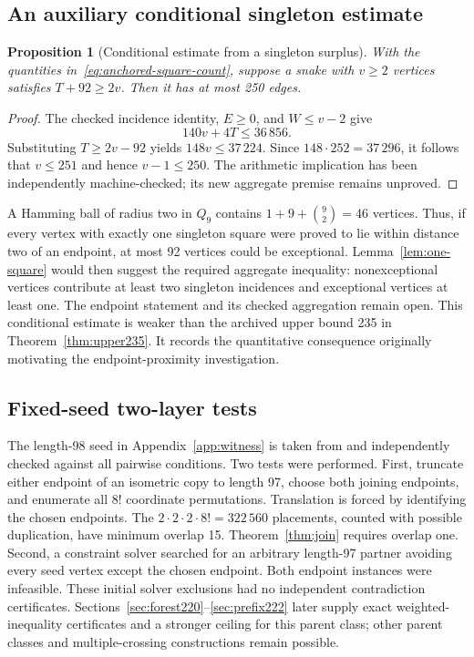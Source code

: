 \documentclass[11pt,a4paper]{article}
\newtheorem{proposition}[theorem]{Proposition}
\theoremstyle{definition}
\theoremstyle{remark}
\newcommand{\Q}{Q}
\begin{document}
\subsection{An auxiliary conditional singleton estimate}
\begin{proposition}[Conditional estimate from a singleton surplus]
With the quantities in~\eqref{eq:anchored-square-count}, suppose a snake with $v\ge2$ vertices satisfies $T+92\ge2v$. Then it has at most 250 edges.
\end{proposition}
\begin{proof}
The checked incidence identity, $E\ge0$, and $W\le v-2$ give
\[
140v+4T\le36\,856.
\]
Substituting $T\ge2v-92$ yields $148v\le37\,224$. Since $148\cdot252=37\,296$, it follows that $v\le251$ and hence $v-1\le250$. The arithmetic implication has been independently machine-checked; its new aggregate premise remains unproved.
\end{proof}
A Hamming ball of radius two in $\Q_9$ contains $1+9+\binom92=46$ vertices. Thus, if every vertex with exactly one singleton square were proved to lie within distance two of an endpoint, at most 92 vertices could be exceptional. Lemma~\ref{lem:one-square} would then suggest the required aggregate inequality: nonexceptional vertices contribute at least two singleton incidences and exceptional vertices at least one. The endpoint statement and its checked aggregation remain open. This conditional estimate is weaker than the archived upper bound 235 in Theorem~\ref{thm:upper235}. It records the quantitative consequence originally motivating the endpoint-proximity investigation.

\subsection{Fixed-seed two-layer tests}
The length-98 seed in Appendix~\ref{app:witness} is taken from \cite{records} and independently checked against all pairwise conditions. Two tests were performed. First, truncate either endpoint of an isometric copy to length 97, choose both joining endpoints, and enumerate all $8!$ coordinate permutations. Translation is forced by identifying the chosen endpoints. The $2\cdot2\cdot2\cdot8!=322\,560$ placements, counted with possible duplication, have minimum overlap 15. Theorem~\ref{thm:join} requires overlap one. Second, a constraint solver searched for an arbitrary length-97 partner avoiding every seed vertex except the chosen endpoint. Both endpoint instances were infeasible. These initial solver exclusions had no independent contradiction certificates. Sections~\ref{sec:forest220}--\ref{sec:prefix222} later supply exact weighted-inequality certificates and a stronger ceiling for this parent class; other parent classes and multiple-crossing constructions remain possible.
\end{document}

